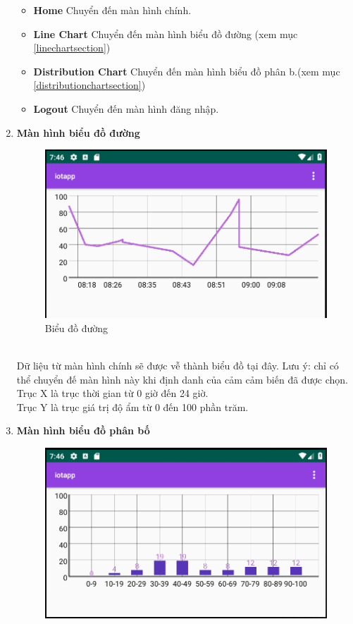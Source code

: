 \documentclass[a4paper]{article}
\begin{document}
\begin{enumerate}
\begin{itemize}
		\item \textbf{Home} Chuyển đến màn hình chính.\\
		\item \textbf{Line Chart} Chuyển đến màn hình biểu đồ đường (xem mục \ref{linechartsection})\\
		\item \textbf{Distribution Chart} Chuyển đến màn hình biểu đồ phân b.(xem mục \ref{distributionchartsection})\\
		\item \textbf{Logout} Chuyển đến màn hình đăng nhập.
		\end{itemize}	
	\item \textbf{Màn hình biểu đồ đường} \label{linechartsection}\\
	\begin{figure}[htp]
       		\centering
       		\includegraphics[scale=0.7]{linechart.png}
        		\caption{Biểu đồ đường}
       		 \label{fig:linechartApp}
    	\end{figure}\\
	Dữ liệu từ màn hình chính sẽ được vễ thành biểu đồ tại đây. Lưu ý: chỉ có thể chuyển đế màn hình này khi định danh của cảm 			cảm biến đã được chọn.\\
	Trục X là trục thời gian từ 0 giờ đến 24 giờ.\\
	Trục Y là trục giá trị độ ẩm từ 0 đến 100 phần trăm.
	\item \textbf{Màn hình biểu đồ phân bố}\label{distributionchartsection}\\
	\begin{figure}[htp]
       		\centering
       		\includegraphics[scale=0.7]{distributionchart.png}

\end{figure}
\end{enumerate}
\end{document}
